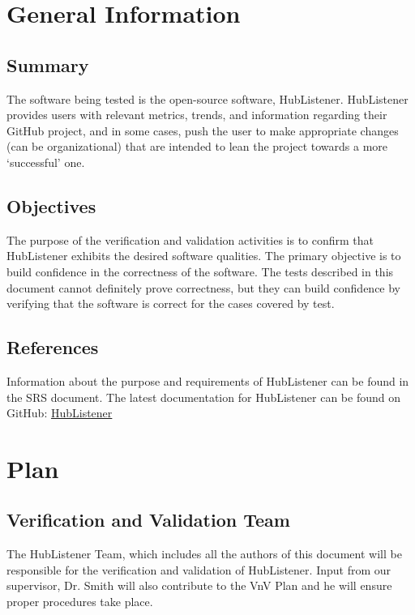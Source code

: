 \documentclass[12pt, titlepage]{article}
\begin{document}
\section{General Information}

\subsection{Summary}
The software being tested is the open-source software, HubListener.  HubListener provides users with relevant metrics, trends, and
information regarding their GitHub project, and in some cases, push the user to make appropriate changes (can be organizational) that are intended to lean the project towards a more `successful' one.

\subsection{Objectives}
The purpose of the verification and validation activities is to confirm that HubListener exhibits the desired software qualities. The primary objective is to build confidence in the correctness of the software. The tests described in this document cannot definitely prove correctness, but they can build confidence by verifying that the software is correct for the cases covered by test. 
\subsection{References}

Information about the purpose and requirements of HubListener can be found in the SRS document. The latest documentation for HubListener can be found on GitHub:  \href{https://github.com/pjmc-oliveira/HubListener/}{HubListener}

\section{Plan}

\subsection{Verification and Validation Team}

The HubListener Team, which includes all the authors of this document will be responsible for the verification and validation of HubListener. Input from our supervisor, Dr.  Smith  will also contribute to the VnV Plan and he will ensure proper procedures take place. 
\end{document}
